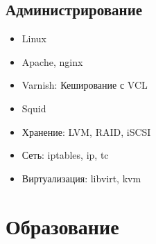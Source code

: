 \documentclass[11pt,a4paper,sans]{moderncv}        %
\begin{document}
\begin{itemize}
\end{itemize}

\subsection{Администрирование}

\begin{itemize}
\item Linux
\item Apache, nginx
\item Varnish: Кеширование с VCL
\item Squid
\item Хранение: LVM, RAID, iSCSI
\item Сеть: iptables, ip, tc
\item Виртуализация: libvirt, kvm
\end{itemize}

\section{Образование}
\end{document}
